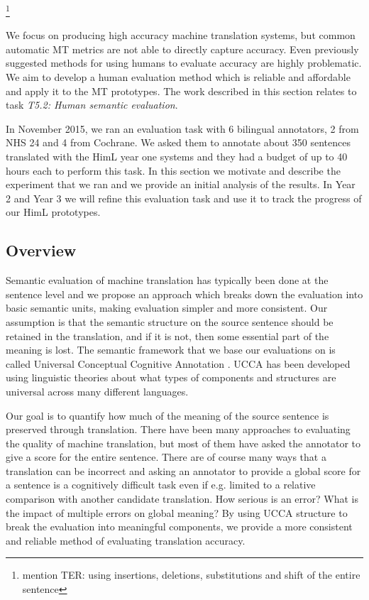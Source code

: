 \documentclass[11pt]{article}
\newcommand{\oa}[1]{\footnote{\color{red} #1}}
\begin{document}
\oa{mention TER: using insertions, deletions, substitutions and shift of the entire sentence}

\label{sec:sem-eval:human}
We focus on producing high accuracy machine translation systems, but common 
automatic MT metrics are not able to directly capture accuracy. Even previously suggested methods
for using humans to evaluate accuracy are highly problematic. We aim to  develop a human evaluation method 
which is reliable and affordable and apply it to the MT prototypes. 
The
work described
in this section relates to 
task
\emph{T5.2: Human semantic evaluation}.


In November 2015, we ran an evaluation task with 6 bilingual annotators, 2 from NHS 24 and 4 from Cochrane. 
We asked them to annotate about 350 sentences translated with the HimL year one systems 
and they had a budget of  up  to 40 hours each to perform this task. 
In this section we motivate and describe the experiment that we ran and we provide an initial analysis of
the results. In  Year 2 and Year 3 we will refine this evaluation task and use it to track the progress of our HimL prototypes.


\subsection{Overview}

Semantic evaluation of machine translation has typically been done at the sentence level and
we propose an  approach which breaks down the evaluation into basic semantic units, making evaluation 
simpler and more consistent. 
Our  assumption is that the semantic structure on the source sentence should be 
retained in the translation, and if it is not, then some essential part of the meaning 
is
lost. 
The semantic framework that we base our evaluations on is called 
Universal Conceptual Cognitive Annotation .  
UCCA has been developed using linguistic theories about 
what types of components and structures are universal across many different languages.

Our goal is to quantify how much of the meaning of the source sentence is preserved through translation.
There have been many approaches to evaluating the quality of machine translation, but most of them
have asked the annotator to give a score for the entire sentence. There are of course many ways 
that a translation can be incorrect and asking an annotator to provide a global score for a sentence
is a cognitively difficult task even if e.g. limited to a relative comparison
with another candidate translation. How serious is an error? What is the impact of multiple errors on global meaning?
By using UCCA structure to break the evaluation into meaningful components, we provide 
a more consistent and reliable method of evaluating translation accuracy.
\end{document}
